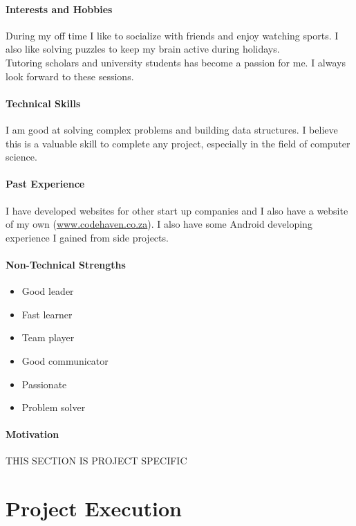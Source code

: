 \documentclass[english]{article}
\begin{document}
			\paragraph{Interests and Hobbies}
			During my off time I like to socialize with friends and enjoy watching sports. I also like solving puzzles to keep my brain active during holidays.\\
			Tutoring scholars and university students has become a passion for me. I always look forward to these sessions.
			
			\paragraph{Technical Skills}
			I am good at solving complex problems and building data structures. I believe this is a valuable skill to complete any project, especially in the field of computer science.
			
			\paragraph{Past Experience}
			I have developed websites for other start up companies and I also have a website of my own (\href{http://www.codehaven.co.za}{www.codehaven.co.za}).
			I also have some Android developing experience I gained from side projects.
			
			\paragraph{Non-Technical Strengths}
			\begin{itemize}
				\setlength\itemsep{0.2em}
				\item Good leader
				\item Fast learner
				\item Team player
				\item Good communicator
				\item Passionate
				\item Problem solver
			\end{itemize}
			
			\paragraph{Motivation}
			THIS SECTION IS PROJECT SPECIFIC
			
	\newpage
	\section{Project Execution}
\end{document}
